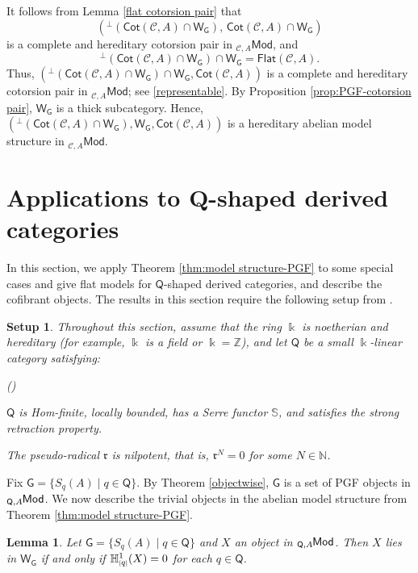 \documentclass{amsart}
\theoremstyle{bfupright head,slanted body}
\theoremstyle{bfupright head,upright body}
\theoremstyle{fixed bf head,slanted body}
\newtheorem{lem}[res]{Lemma}            \newtheorem*{lem*}{Lemma}
\theoremstyle{fixed bf head,upright body}
\newtheorem{setup}[res]{Setup}           \newtheorem*{setup*}{Setup}
\theoremstyle{numbered paragraph}
\newlength{\thmlistleft}        %
\newlength{\thmlistright}       %
\newlength{\thmlistpartopsep}   %
\newlength{\thmlisttopsep}      %
\newlength{\thmlistparsep}      %
\newlength{\thmlistitemsep}     %
\newcounter{rqm}
\newenvironment{rqm}{\begin{list}{\upshape (\arabic{rqm})}%
		{\usecounter{rqm}%
			\setlength{\leftmargin}{\thmlistleft}%
			\setlength{\labelwidth}{\thmlistleft}%
			\setlength{\rightmargin}{\thmlistright}%
			\setlength{\partopsep}{\thmlistpartopsep}%
			\setlength{\topsep}{\thmlisttopsep}%
			\setlength{\parsep}{\thmlistparsep}%
			\setlength{\itemsep}{\thmlistitemsep}}}%
	{\end{list}}%
\newenvironment{prf*}[1][Proof]{%
	\begin{proof}[\bf #1]
		\setcounter{equation}{0}
		\renewcommand{\theequation}{\arabic{equation}}}
	{\end{proof}
}
\numberwithin{equation}{res}
\newcommand{\Flat}[1]{\mathsf{Flat}(#1)}
\newcommand{\Cot}[1]{\mathsf{Cot}(#1)}
\newcommand{\Mod}[1]{{_{#1}\mathsf{Mod}}}
\newcommand{\cH}[2][1]{\mathbb{H}^{#1}_{\textnormal{\tiny[}#2\textnormal{\tiny]}}}
\newcommand{\G}{\mathsf{G}}
\newcommand{\WG}{\mathsf{W}_{\mathsf{G}}}
\newcommand{\C}{\mathcal{C}}
\newcommand{\Q}{\mathsf{Q}}
\newcommand{\kk}{\Bbbk}
\newcommand{\lMod}[1]{{}_{#1}\mspace{-1mu}{\sf{Mod}}}
\begin{document}
\begin{prf*}
It follows from Lemma \ref{flat cotorsion pair} that
\[
(^{\perp}(\Cot{\C,A}\cap\WG), \, \Cot{\C,A}\cap\WG)
\]
is a complete and hereditary cotorsion pair in $\Mod{\C,A}$, and
\[
^{\perp}(\Cot{\C,A}\cap\WG)\cap\WG=\Flat{\C,A}.
\]
Thus, $(^{\perp}(\Cot{\C,A}\cap\WG)\cap\WG, \Cot{\C,A})$ is a complete and hereditary cotorsion pair in $\Mod{\C,A}$; see \ref{representable}. By Proposition \ref{prop:PGF-cotorsion pair}, $\WG$ is a thick subcategory. Hence, $({^{\perp}(\Cot{\C,A}\cap\WG)}, \WG, \Cot{\C,A})$ is a hereditary abelian model structure in $\Mod{\C,A}$.
\end{prf*}

\section{Applications to Q-shaped derived categories}
\noindent
In this section, we apply Theorem \ref{thm:model structure-PGF} to some special cases and give flat models for $\Q$-shaped derived categories, and describe the cofibrant objects. The results in this section require the following setup from \cite{HJ21}.

\begin{setup}
Throughout this section, assume that the ring $\kk$ is noetherian and hereditary (for example, $\kk$ is a field or $\kk=\mathbb{Z}$), and let $\Q$ be a small $\kk$-linear category satisfying:
\begin{rqm}
\item[$\bullet$]
     $\Q$ is Hom-finite, locally bounded, has a Serre functor $\mathbb{S}$, and satisfies the strong retraction property.
\item[$\bullet$]
     The pseudo-radical $\mathfrak{r}$ is nilpotent, that is, $\mathfrak{r}^N=0$ for some $N\in\mathbb{N}$.
\end{rqm}
\end{setup}

Fix $\G=\{S_{q}(A)\mid q\in \Q\}$. By Theorem \ref{objectwise}, $\G$ is a set of PGF objects in $\lMod{\Q,A}$. We now describe the trivial objects in the abelian model structure from Theorem \ref{thm:model structure-PGF}.

\begin{lem}\label{wg}
Let $\G=\{S_{q}(A)\mid q\in \Q\}$ and $X$ an object in $\lMod{\Q,A}$. Then $X$ lies in $\WG$ if and only if $\cH[1]{q}(X)=0$ for each $q\in\Q$.
\end{lem}
\end{document}
